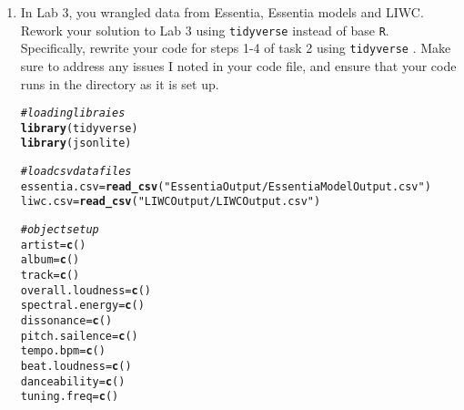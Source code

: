 \documentclass{article}\usepackage[]{graphicx}\usepackage[]{xcolor}
\makeatletter
\newcommand{\hlsng}[1]{\textcolor[rgb]{0.192,0.494,0.8}{#1}}%
\newcommand{\hlcom}[1]{\textcolor[rgb]{0.678,0.584,0.686}{\textit{#1}}}%
\newcommand{\hldef}[1]{\textcolor[rgb]{0.345,0.345,0.345}{#1}}%
\newcommand{\hlkwb}[1]{\textcolor[rgb]{0.69,0.353,0.396}{#1}}%
\newcommand{\hlkwd}[1]{\textcolor[rgb]{0.737,0.353,0.396}{\textbf{#1}}}%
\newenvironment{kframe}{%
 \def\at@end@of@kframe{}%
 \ifinner\ifhmode%
  \def\at@end@of@kframe{\end{minipage}}%
  \begin{minipage}{\columnwidth}%
 \fi\fi%
 \def\FrameCommand##1{\hskip\@totalleftmargin \hskip-\fboxsep
 \colorbox{shadecolor}{##1}\hskip-\fboxsep
     \hskip-\linewidth \hskip-\@totalleftmargin \hskip\columnwidth}%
 \MakeFramed {\advance\hsize-\width
   \@totalleftmargin\z@ \linewidth\hsize
   \@setminipage}}%
 {\par\unskip\endMakeFramed%
 \at@end@of@kframe}
\newenvironment{knitrout}{}{} %
\makeatother
\begin{document}
\begin{enumerate}
\item In Lab 3, you wrangled data from Essentia, Essentia models and LIWC. Rework your 
solution to Lab 3 using \texttt{tidyverse} \citep{tidyverse} instead of base \texttt{R}.
Specifically, rewrite your code for steps 1-4 of task 2 using \texttt{tidyverse} \citep{tidyverse}. 
Make sure to address any issues I noted in your code file, and ensure that your code 
runs in the directory as it is set up.
\begin{knitrout}\scriptsize
{}\color{fgcolor}\begin{kframe}
\begin{alltt}
\hlcom{#loading libraies}
\hlkwd{library}\hldef{(tidyverse)}
\hlkwd{library}\hldef{(jsonlite)}

\hlcom{#load csv data files}
\hldef{essentia.csv} \hlkwb{=} \hlkwd{read_csv}\hldef{(}\hlsng{"EssentiaOutput/EssentiaModelOutput.csv"}\hldef{)}
\hldef{liwc.csv} \hlkwb{=} \hlkwd{read_csv}\hldef{(}\hlsng{"LIWCOutput/LIWCOutput.csv"}\hldef{)}

\hlcom{#object setup}
\hldef{artist} \hlkwb{=} \hlkwd{c}\hldef{()}
\hldef{album} \hlkwb{=} \hlkwd{c}\hldef{()}
\hldef{track} \hlkwb{=} \hlkwd{c}\hldef{()}
\hldef{overall.loudness} \hlkwb{=} \hlkwd{c}\hldef{()}
\hldef{spectral.energy} \hlkwb{=} \hlkwd{c}\hldef{()}
\hldef{dissonance} \hlkwb{=} \hlkwd{c}\hldef{()}
\hldef{pitch.sailence} \hlkwb{=} \hlkwd{c}\hldef{()}
\hldef{tempo.bpm} \hlkwb{=} \hlkwd{c}\hldef{()}
\hldef{beat.loudness} \hlkwb{=} \hlkwd{c}\hldef{()}
\hldef{danceability} \hlkwb{=} \hlkwd{c}\hldef{()}
\hldef{tuning.freq} \hlkwb{=} \hlkwd{c}\hldef{()}


\end{alltt}
\end{kframe}
\end{knitrout}
\end{enumerate}
\end{document}
